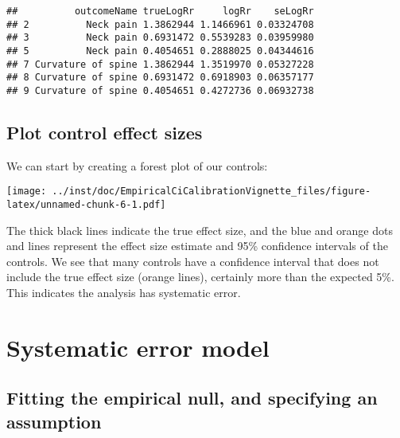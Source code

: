 \documentclass[
]{article}
\newenvironment{Shaded}{\begin{snugshade}}{\end{snugshade}}
\newcommand{\KeywordTok}[1]{\textcolor[rgb]{0.13,0.29,0.53}{\textbf{#1}}}
\newcommand{\NormalTok}[1]{#1}
\newcommand{\OperatorTok}[1]{\textcolor[rgb]{0.81,0.36,0.00}{\textbf{#1}}}
\newcommand{\StringTok}[1]{\textcolor[rgb]{0.31,0.60,0.02}{#1}}
\begin{document}
\begin{verbatim}
##          outcomeName trueLogRr     logRr    seLogRr
## 2          Neck pain 1.3862944 1.1466961 0.03324708
## 3          Neck pain 0.6931472 0.5539283 0.03959980
## 5          Neck pain 0.4054651 0.2888025 0.04344616
## 7 Curvature of spine 1.3862944 1.3519970 0.05327228
## 8 Curvature of spine 0.6931472 0.6918903 0.06357177
## 9 Curvature of spine 0.4054651 0.4272736 0.06932738
\end{verbatim}

\hypertarget{plot-control-effect-sizes}{%
\subsection{Plot control effect sizes}\label{plot-control-effect-sizes}}

We can start by creating a forest plot of our controls:

\begin{Shaded}
\end{Shaded}

\texttt{[image: ../inst/doc/EmpiricalCiCalibrationVignette\_files/figure-latex/unnamed-chunk-6-1.pdf]}

The thick black lines indicate the true effect size, and the blue and
orange dots and lines represent the effect size estimate and 95\%
confidence intervals of the controls. We see that many controls have a
confidence interval that does not include the true effect size (orange
lines), certainly more than the expected 5\%. This indicates the
analysis has systematic error.

\hypertarget{systematic-error-model}{%
\section{Systematic error model}\label{systematic-error-model}}

\hypertarget{fitting-the-empirical-null-and-specifying-an-assumption}{%
\subsection{Fitting the empirical null, and specifying an
assumption}\label{fitting-the-empirical-null-and-specifying-an-assumption}}
\end{document}
